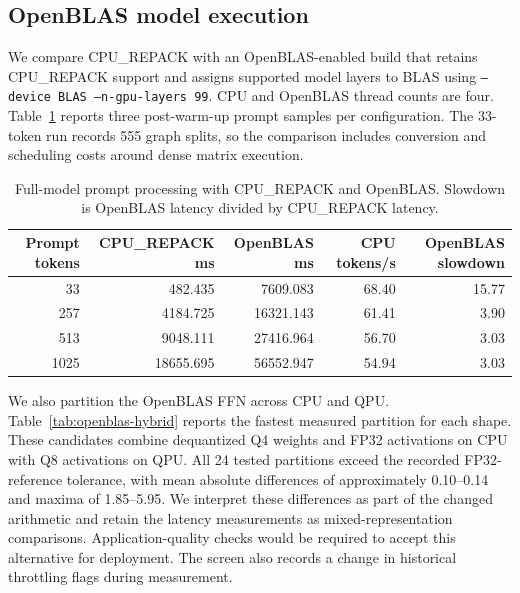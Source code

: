 \documentclass[sigplan,screen,review]{acmart}
\begin{document}
\subsection{OpenBLAS model execution}
\label{app:openblas}

We compare CPU\_REPACK with an OpenBLAS-enabled build that retains CPU\_REPACK support and assigns supported model layers to BLAS using \texttt{--device BLAS --n-gpu-layers 99}. CPU and OpenBLAS thread counts are four. Table~\ref{tab:openblas-prefill} reports three post-warm-up prompt samples per configuration. The 33-token run records 555 graph splits, so the comparison includes conversion and scheduling costs around dense matrix execution.

\begin{table}[t]
\centering
\caption{Full-model prompt processing with CPU\_REPACK and OpenBLAS. Slowdown is OpenBLAS latency divided by CPU\_REPACK latency.}
\label{tab:openblas-prefill}
\small
\begin{tabular}{@{}rrrrr@{}}
\toprule
Prompt tokens & CPU\_REPACK ms & OpenBLAS ms & CPU tokens/s & OpenBLAS slowdown \\
\midrule
33 & 482.435 & 7609.083 & 68.40 & 15.77 \\
257 & 4184.725 & 16321.143 & 61.41 & 3.90 \\
513 & 9048.111 & 27416.964 & 56.70 & 3.03 \\
1025 & 18655.695 & 56552.947 & 54.94 & 3.03 \\
\bottomrule
\end{tabular}
\end{table}

We also partition the OpenBLAS FFN across CPU and QPU. Table~\ref{tab:openblas-hybrid} reports the fastest measured partition for each shape. These candidates combine dequantized Q4 weights and FP32 activations on CPU with Q8 activations on QPU. All 24 tested partitions exceed the recorded FP32-reference tolerance, with mean absolute differences of approximately 0.10--0.14 and maxima of 1.85--5.95. We interpret these differences as part of the changed arithmetic and retain the latency measurements as mixed-representation comparisons. Application-quality checks would be required to accept this alternative for deployment. The screen also records a change in historical throttling flags during measurement.
\end{document}
